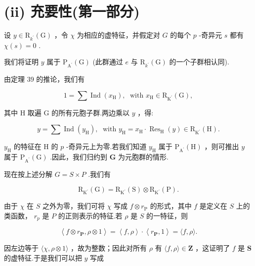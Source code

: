 \documentclass[10pt]{article}
\begin{document}
\section*{(ii) 充要性(第一部分)}

设 \(y \in  {\mathrm{R}}_{{k}^{\prime }}\left( \mathrm{G}\right)\) ，令 \(\chi\) 为相应的虚特征，并假定对 \(G\) 的每个 \(p\) -奇异元 \(s\) 都有 \(\chi \left( s\right)  = 0\) .

我们将证明 \(y\) 属于 \({\mathrm{P}}_{{\mathrm{A}}^{\prime }}\left( \mathrm{G}\right)\) (此群通过 \(e\) 与 \({\mathrm{R}}_{{k}^{\prime }}\left( \mathrm{G}\right)\) 的一个子群相认同).

由定理 39 的推论，我们有

\[
1 = \sum \operatorname{Ind}\left( {x}_{\mathrm{H}}\right) ,\;\text{ with }{x}_{\mathrm{H}} \in  {\mathrm{R}}_{{\mathrm{K}}^{\prime }}\left( \mathrm{G}\right) ,
\]

其中 \(\mathrm{H}\) 取遍 G 的所有元胞子群.两边乘以 \(y\) ，得:

\[
y = \sum \operatorname{Ind}\left( {y}_{\mathrm{H}}\right) ,\;\text{ with }{y}_{\mathrm{H}} = {x}_{\mathrm{H}} \cdot  {\operatorname{Res}}_{\mathrm{H}}\left( y\right)  \in  {\mathrm{R}}_{{\mathrm{K}}^{\prime }}\left( \mathrm{H}\right) .
\]

\({y}_{\mathrm{H}}\) 的特征在 \(\mathrm{H}\) 的 \(p\) -奇异元上为零.若我们知道 \({y}_{\mathrm{H}}\) 属于 \({\mathrm{P}}_{{\mathrm{A}}^{\prime }}\left( \mathrm{H}\right)\) ，则可推出 \(y\) 属于 \({\mathrm{P}}_{{\mathrm{A}}^{\prime }}\left( \mathrm{G}\right)\) .因此，我们归约到 \(\mathbf{G}\) 为元胞群的情形.

现在按上述分解 \(G = S \times  P\) .我们有

\[
{\mathrm{R}}_{{\mathrm{K}}^{\prime }}\left( \mathrm{G}\right)  = {\mathrm{R}}_{{\mathrm{K}}^{\prime }}\left( \mathrm{S}\right)  \otimes  {\mathrm{R}}_{{\mathrm{K}}^{\prime }}\left( \mathrm{P}\right) .
\]

由于 \(\chi\) 在 \(S\) 之外为零，我们可将 \(\chi\) 写成 \(f \otimes  {r}_{\mathrm{P}}\) 的形式，其中 \(f\) 是定义在 \(S\) 上的类函数， \({r}_{p}\) 是 \(P\) 的正则表示的特征.若 \(\rho\) 是 \(S\) 的一特征，则

\[
\left\langle  {f \otimes  {r}_{\mathbf{P}},\rho  \otimes  1}\right\rangle   = \left\langle  {f,\rho }\right\rangle   \cdot  \left\langle  {{r}_{\mathbf{P}},1}\right\rangle   = \langle f,\rho \rangle .
\]

因左边等于 \(\langle \chi ,\rho  \otimes  1\rangle\) ，故为整数；因此对所有 \(\rho\) 有 \(\langle f,\rho \rangle  \in  \mathbf{Z}\) ，这证明了 \(f\) 是 \(\mathbf{S}\) 的虚特征.于是我们可以把 \(y\) 写成
\end{document}
